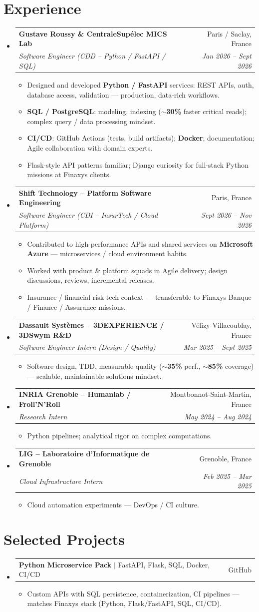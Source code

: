 \documentclass[letterpaper,10.5pt]{article}
\makeatletter
\newcommand{\resumeItem}[1]{\item\small{#1 \vspace{-1.5pt}}}
\newcommand{\resumeSubheading}[4]{\vspace{-1pt}\item\begin{tabular*}{0.97\textwidth}[t]{l@{\extracolsep{\fill}}r}\textbf{#1} & #2 \\\textit{\small#3} & \textit{\small #4} \\\end{tabular*}\vspace{-5pt}}
\newcommand{\resumeProjectHeading}[2]{\item\begin{tabular*}{0.97\textwidth}{l@{\extracolsep{\fill}}r}\small#1 & #2 \\\end{tabular*}\vspace{-5pt}}
\newcommand{\resumeSubHeadingListStart}{\begin{itemize}[leftmargin=0.15in, label={}]}
\newcommand{\resumeSubHeadingListEnd}{\end{itemize}}
\newcommand{\resumeItemListStart}{\begin{itemize}[leftmargin=0.18in]}
\newcommand{\resumeItemListEnd}{\end{itemize}\vspace{-3pt}}
\makeatother
\begin{document}
\section{Experience}
\resumeSubHeadingListStart
  \resumeSubheading
    {Gustave Roussy \& CentraleSup\'elec MICS Lab}{Paris / Saclay, France}
    {Software Engineer (CDD -- Python / FastAPI / SQL)}{Jan 2026 -- Sept 2026}
    \resumeItemListStart
      \resumeItem{Designed and developed \textbf{Python / FastAPI} services: REST APIs, auth, database access, validation --- production, data-rich workflows.}
      \resumeItem{\textbf{SQL / PostgreSQL}: modeling, indexing (\textbf{$\sim$30\%} faster critical reads); complex query / data processing mindset.}
      \resumeItem{\textbf{CI/CD}: GitHub Actions (tests, build artifacts); \textbf{Docker}; documentation; Agile collaboration with domain experts.}
      \resumeItem{Flask-style API patterns familiar; Django curiosity for full-stack Python missions at Finaxys clients.}
    \resumeItemListEnd
  \resumeSubheading
    {Shift Technology -- Platform Software Engineering}{Paris, France}
    {Software Engineer (CDI -- InsurTech / Cloud Platform)}{Sept 2026 -- Nov 2026}
    \resumeItemListStart
      \resumeItem{Contributed to high-performance APIs and shared services on \textbf{Microsoft Azure} --- microservices / cloud environment habits.}
      \resumeItem{Worked with product \& platform squads in Agile delivery; design discussions, reviews, incremental releases.}
      \resumeItem{Insurance / financial-risk tech context --- transferable to Finaxys Banque / Finance / Assurance missions.}
    \resumeItemListEnd
  \resumeSubheading
    {Dassault Syst\`emes -- 3DEXPERIENCE / 3DSwym R\&D}{V\'elizy-Villacoublay, France}
    {Software Engineer Intern (Design / Quality)}{Mar 2025 -- Sept 2025}
    \resumeItemListStart
      \resumeItem{Software design, TDD, measurable quality (\textbf{$\sim$35\%} perf., \textbf{$\sim$85\%} coverage) --- scalable, maintainable solutions mindset.}
    \resumeItemListEnd
  \resumeSubheading
    {INRIA Grenoble -- Humanlab / Froll'N'Roll}{Montbonnot-Saint-Martin, France}
    {Research Intern}{May 2024 -- Aug 2024}
    \resumeItemListStart
      \resumeItem{Python pipelines; analytical rigor on complex computations.}
    \resumeItemListEnd
  \resumeSubheading
    {LIG -- Laboratoire d'Informatique de Grenoble}{Grenoble, France}
    {Cloud Infrastructure Intern}{Feb 2025 -- Mar 2025}
    \resumeItemListStart
      \resumeItem{Cloud automation experiments --- DevOps / CI culture.}
    \resumeItemListEnd
\resumeSubHeadingListEnd
\section{Selected Projects}
\resumeSubHeadingListStart
  \resumeProjectHeading{\textbf{Python Microservice Pack} $|$ FastAPI, Flask, SQL, Docker, CI/CD}{GitHub}
    \resumeItemListStart
      \resumeItem{Custom APIs with SQL persistence, containerization, CI pipelines --- matches Finaxys stack (Python, Flask/FastAPI, SQL, CI/CD).}
    \resumeItemListEnd
\resumeSubHeadingListEnd
\end{document}
